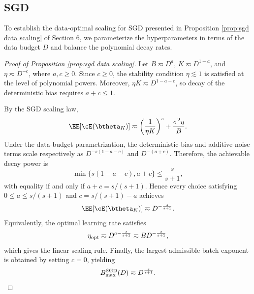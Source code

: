 \subsection{SGD}
\label{app:sgd_scaling_analysis}

To establish the data-optimal scaling for SGD presented in Proposition \ref{prop:sgd data scaling} of Section 6, we parameterize the hyperparameters in terms of the data budget \(D\) and balance the polynomial decay rates.

\begin{proof}[Proof of Proposition \ref{prop:sgd data scaling}]
Let \(B\eqsim D^a\), \(K\eqsim D^{1-a}\), and \(\eta\eqsim D^{-c}\), where \(a,c\ge0\). Since \(c\ge0\), the stability condition \(\eta\lesssim1\) is satisfied at the level of polynomial powers. Moreover, \(\eta K\eqsim D^{1-a-c}\), so decay of the deterministic bias requires \(a+c\le1\).

By the SGD scaling law,
\[
    \EE[\cE(\btheta_K)]
    \eqsim
    \left(\frac{1}{\eta K}\right)^s
    +
    \frac{\sigma^2\eta}{B}.
\]
Under the data-budget parametrization, the deterministic-bias and additive-noise terms scale respectively as \(D^{-s(1-a-c)}\) and \(D^{-(a+c)}\). Therefore, the achievable decay power is
\[
    \min\{s(1-a-c),a+c\}
    \leq
    \frac{s}{s+1},
\]
with equality if and only if \(a+c=s/(s+1)\). Hence every choice satisfying \(0\le a\le s/(s+1)\) and \(c=s/(s+1)-a\) achieves
\[
    \EE[\cE(\btheta_K)]
    \eqsim
    D^{-\frac{s}{s+1}}.
\]
Equivalently, the optimal learning rate satisfies
\[
    \eta_{\rm opt}
    \eqsim
    D^{a-\frac{s}{s+1}}
    \eqsim
    B D^{-\frac{s}{s+1}},
\]
which gives the linear scaling rule. Finally, the largest admissible batch exponent is obtained by setting \(c=0\), yielding
\[
    B_{\max}^{\rm SGD}(D)
    \eqsim
    D^{\frac{s}{s+1}}.
\]
\end{proof}




